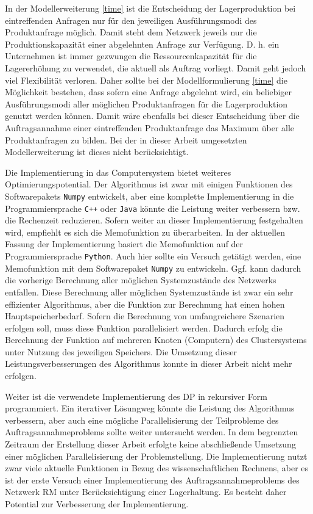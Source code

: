 In der Modellerweiterung \eqref{time} ist die Entscheidung der Lagerproduktion bei eintreffenden Anfragen nur für den jeweiligen Ausführungsmodi des Produktanfrage möglich. Damit steht dem Netzwerk jeweils nur die Produktionskapazität einer abgelehnten Anfrage zur Verfügung. D. h. ein Unternehmen ist immer gezwungen die Ressourcenkapazität für die Lagererhöhung zu verwendet, die aktuell als Auftrag vorliegt. Damit geht jedoch viel Flexibilität verloren. Daher sollte bei der Modellformulierung \eqref{time} die Möglichkeit bestehen, dass sofern eine Anfrage abgelehnt wird, ein beliebiger Ausführungsmodi aller möglichen Produktanfragen für die Lagerproduktion genutzt werden können. Damit wäre ebenfalls bei dieser Entscheidung über die Auftragsannahme einer eintreffenden Produktanfrage das Maximum über alle Produktanfragen zu bilden. Bei der in dieser Arbeit umgesetzten Modellerweiterung ist dieses nicht berücksichtigt.

Die Implementierung in das Computersystem bietet weiteres Optimierungspotential. Der Algorithmus ist zwar mit einigen Funktionen des Softwarepakets \texttt{Numpy} entwickelt, aber eine komplette Implementierung in die Programmiersprache \texttt{C++} oder \texttt{Java} könnte die Leistung weiter verbessern bzw. die Rechenzeit reduzieren. Sofern weiter an dieser Implementierung festgehalten wird, empfiehlt es sich die Memofunktion zu überarbeiten. In der aktuellen Fassung der Implementierung basiert die Memofunktion auf der Programmiersprache \texttt{Python}. Auch hier sollte ein Versuch getätigt werden, eine Memofunktion mit dem Softwarepaket \texttt{Numpy} zu entwickeln. Ggf. kann dadurch die vorherige Berechnung aller möglichen Systemzustände des Netzwerks entfallen. Diese Berechnung aller möglichen Systemzustände ist zwar ein sehr effizienter Algorithmus, aber die Funktion zur Berechnung hat einen hohen Hauptspeicherbedarf. Sofern die Berechnung von umfangreichere Szenarien erfolgen soll, muss diese Funktion parallelisiert werden. Dadurch erfolg die Berechnung der Funktion auf mehreren Knoten (Computern) des Clustersystems unter Nutzung des jeweiligen Speichers. Die Umsetzung dieser Leistungsverbesserungen des Algorithmus konnte in dieser Arbeit nicht mehr erfolgen.

Weiter ist die verwendete Implementierung des DP in rekursiver Form programmiert. Ein iterativer Lösungweg könnte die Leistung des Algorithmus verbessern, aber auch eine mögliche Parallelisierung der Teilprobleme des Auftragsannahmeproblems sollte weiter untersucht werden. In dem begrenzten Zeitraum der Erstellung dieser Arbeit erfolgte keine abschließende Umsetzung einer möglichen Parallelisierung der Problemstellung. Die Implementierung nutzt zwar viele aktuelle Funktionen in Bezug des wissenschaftlichen Rechnens, aber es ist der erste Versuch einer Implementierung des Auftragsannahmeproblems des Netzwerk RM unter Berücksichtigung einer Lagerhaltung. Es besteht daher Potential zur Verbesserung der Implementierung.

